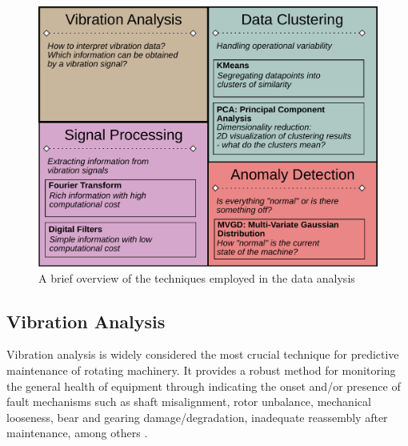 \documentclass[conference]{IEEEtran}
\begin{document}
\begin{figure}[htbp]
\centerline{\includegraphics[width=\columnwidth]{graphics/techniques/techniques_block.pdf}}
\caption{A brief overview of the techniques employed in the data analysis}
\label{techniques_overview}
\end{figure}



\subsection{Vibration Analysis}
\label{sec_vibration_analysis}

Vibration analysis is widely considered the most crucial technique for predictive maintenance of rotating machinery\cite{b1}. It provides a robust method for monitoring the general health of equipment through indicating the onset and/or presence of fault mechanisms such as shaft misalignment, rotor unbalance, mechanical looseness, bear and gearing damage/degradation, inadequate reassembly after maintenance, among others \cite{b1}.



\end{document}
